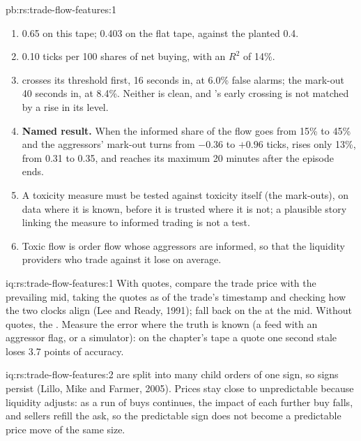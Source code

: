 \begin{solution}{pb:rs:trade-flow-features:1}
\begin{enumerate}
that moves the value in one step.  measures that case, not this one.
\item 0.65 on this tape; 0.403 on the flat tape, against the planted 0.4.
\item 0.10 ticks per 100 shares of net buying, with an $R^2$ of 14\%.
\item {} crosses its threshold first, 16 seconds in, at 6.0\% false alarms; the mark-out 40 seconds in, at 8.4\%. Neither is clean, and
's early crossing is not matched by a rise in its level.
\item \textbf{Named result.} When the informed share of the flow goes from 15\% to 45\% and the aggressors' mark-out turns from $-0.36$ to
$+0.96$ ticks,  rises only 13\%, from 0.31 to 0.35, and reaches its maximum 20 minutes after the episode ends.
\item A toxicity measure must be tested against toxicity itself (the mark-outs), on data where it is known, before it is trusted where it
is not; a plausible story linking the measure to informed trading is not a test.
\item Toxic flow is order flow whose aggressors are informed, so that the liquidity providers who trade against it lose on average.
\end{enumerate}
\end{solution}

\begin{solution}{iq:rs:trade-flow-features:1}
With quotes, compare the trade price with the prevailing mid, taking the quotes as of the trade's timestamp and checking how the two clocks
align (Lee and Ready, 1991); fall back on the  at the mid. Without quotes, the . Measure the error where the truth is
known (a feed with an aggressor flag, or a simulator): on the chapter's tape a quote one second stale loses 3.7 points of accuracy.
\end{solution}

\begin{solution}{iq:rs:trade-flow-features:2}
 are split into many child orders of one sign, so signs persist (Lillo, Mike and Farmer, 2005). Prices stay close to unpredictable
because liquidity adjusts: as a run of buys continues, the impact of each further buy falls, and sellers refill the ask, so the predictable sign
does not become a predictable price move of the same size.
\end{solution}

